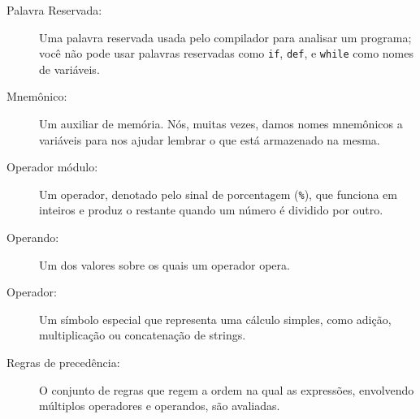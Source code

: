 \begin{description}
\item[Palavra Reservada:] Uma palavra reservada usada pelo compilador para analisar um 
programa; você não pode usar palavras reservadas como {\tt if}, {\tt  def}, e {\tt while} como 
nomes de variáveis.

\item[Mnemônico:] Um auxiliar de memória. Nós, muitas vezes, damos nomes mnemônicos a variáveis 
para nos ajudar lembrar o que está armazenado na mesma.

\item[Operador módulo:] Um operador, denotado pelo sinal de porcentagem 
({\tt \%}), que funciona em inteiros e produz o restante quando um 
número é dividido por outro.

\item[Operando:] Um dos valores sobre os quais um operador opera.

\item[Operador:] Um símbolo especial que representa uma cálculo simples, 
como adição, multiplicação ou concatenação de strings.

\item[Regras de precedência:] O conjunto de regras que regem a ordem na qual as
expressões, envolvendo múltiplos operadores e operandos, são avaliadas.


\end{description}

